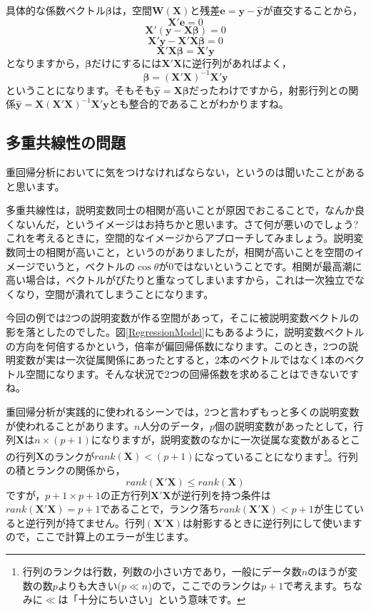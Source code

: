 \documentclass{ltjsbook}
\begin{document}
具体的な係数ベクトル$\bm{\beta}$は，空間$\bm{W(X)}$と残差$\bm{e} = \bm{y} - \hat{\bm{y}}$が直交することから，
\[ \bm{X}'\bm{e} = 0　\]
\[ \bm{X}'(\bm{y} - \bm{X\beta}) = 0 \]
\[ \bm{X}'\bm{y} - \bm{X}'\bm{X}\bm{\beta} = 0 \]
\[ \bm{X}'\bm{X}\bm{\beta} = \bm{X}'\bm{y} \]
となりますから，$\bm{\beta}$だけにするには$\bm{X}'\bm{X}$に逆行列があればよく，
\[ \bm{\beta} = (\bm{X}'\bm{X})^{-1}\bm{X}'\bm{y} \]
ということになります。そもそも$\hat{\bm{y}} = \bm{X\beta}$だったわけですから，射影行列との関係$\hat{\bm{y}} = \bm{X}(\bm{X}'\bm{X})^{-1}\bm{X}' \bm{y} $とも整合的であることがわかりますね。
\subsection{多重共線性の問題}
重回帰分析においてに気をつけなければならない，というのは聞いたことがあると思います。

多重共線性は，説明変数同士の相関が高いことが原因でおこることで，なんか良くないんだ，というイメージはお持ちかと思います。さて何が悪いのでしょう?
これを考えるときに，空間的なイメージからアプローチしてみましょう。説明変数同士の相関が高いこと，というのがありましたが，相関が高いことを空間のイメージでいうと，ベクトルの$\cos \theta$が0ではないということです。相関が最高潮に高い場合は，ベクトルがぴたりと重なってしまいますから，これは一次独立でなくなり，空間が潰れてしまうことになります。

今回の例では2つの説明変数が作る空間があって，そこに被説明変数ベクトルの影を落としたのでした。図\ref{RegressionModel}にもあるように，説明変数ベクトルの方向を何倍するかという，倍率が偏回帰係数になります。このとき，2つの説明変数が実は一次従属関係にあったとすると，2本のベクトルではなく1本のベクトル空間になります。そんな状況で2つの回帰係数を求めることはできないですね。

重回帰分析が実践的に使われるシーンでは，2つと言わずもっと多くの説明変数が使われることがあります。$n$人分のデータ，$p$個の説明変数があったとして，行列$\bm{X}$は$n\times (p+1)$になりますが，説明変数のなかに一次従属な変数があるとこの行列$\bm{X}$のランクが$rank(\bm{X}) < (p+1)$になっていることになります\footnote{行列のランクは行数，列数の小さい方であり，一般にデータ数$n$のほうが変数の数$p$よりも大きい($p\ll n$)ので，ここでのランクは$p+1$で考えます。ちなみに$\ll$は「十分にちいさい」という意味です。}。行列の積とランクの関係から，
\[ rank(\bm{X}'\bm{X}) \le rank(\bm{X}) \]
ですが，$p+1 \times p+1$の正方行列$\bm{X}'\bm{X}$が逆行列を持つ条件は$rank(\bm{X}'\bm{X}) = p+1$であることで，ランク落ち$rank(\bm{X}'\bm{X}) < p+1$が生じていると逆行列が持てません。行列$(\bm{X}'\bm{X})$は射影するときに逆行列にして使いますので，ここで計算上のエラーが生じます。
\end{document}
